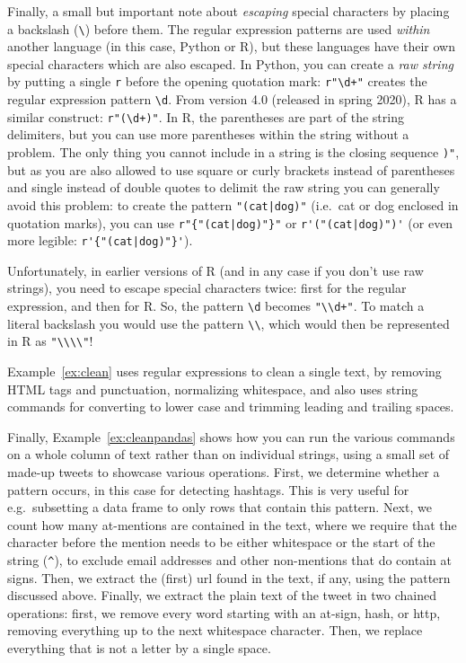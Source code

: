 Finally, a small but important note about \emph{escaping} special characters by placing a backslash (\verb|\|) before them.
The regular expression patterns are used \emph{within} another language (in this case, Python or R), but these languages have their own
special characters which are also escaped. In Python, you can create a \emph{raw string} by putting a single \verb|r| before the opening quotation mark:
\verb|r"\d+"| creates the regular expression pattern \verb|\d|.
From version 4.0 (released in spring 2020), R has a similar construct: \verb|r"(\d+)"|. In R, the parentheses are part of the string delimiters, but you can use more parentheses within the string without a problem.
The only thing you cannot include in a string is the closing sequence \verb|)"|, but as you are also allowed to use square or curly brackets instead of parentheses and single instead of double quotes to delimit the raw string you can generally avoid this problem:
to create the pattern \verb!"(cat|dog)"! (i.e.\ cat or dog enclosed in quotation marks), you can use \verb!r"{"(cat|dog)"}"! or \verb!r'("(cat|dog)")'! (or even more legible: \verb!r'{"(cat|dog)"}'!).

Unfortunately, in earlier versions of R (and in any case if you don't use raw strings), you need to escape special characters twice:
first for the regular expression, and then for R. So, the pattern \verb|\d| becomes \verb|"\\d+"|. To match a literal backslash you would use the pattern \verb|\\|,
which would then be represented in R as \verb|"\\\\"|!

Example~\ref{ex:clean} uses regular expressions to clean a single text, by removing HTML tags and punctuation,
normalizing whitespace, and also uses string commands for converting to lower case and trimming leading and trailing spaces.


Finally, Example~\ref{ex:cleanpandas} shows how you can run the various commands on a whole column of text rather than on individual strings,
using  a small set of made-up tweets to showcase various operations.
First, we determine whether a pattern occurs, in this case for detecting hashtags.
This is very useful for e.g.\ subsetting a data frame to only rows that contain this pattern.
Next, we count how many at-mentions are contained in the text, where we require that the character before the mention needs to be either whitespace or the start of the string (\verb|^|), to exclude email addresses and other non-mentions that do contain at signs.
Then, we extract the (first) url found in the text, if any, using the pattern discussed above.
Finally, we extract the plain text of the tweet in two chained operations:
first, we remove every word starting with an at-sign, hash, or http, removing everything up to the next whitespace character.
Then, we replace everything that is not a letter by a single space.


